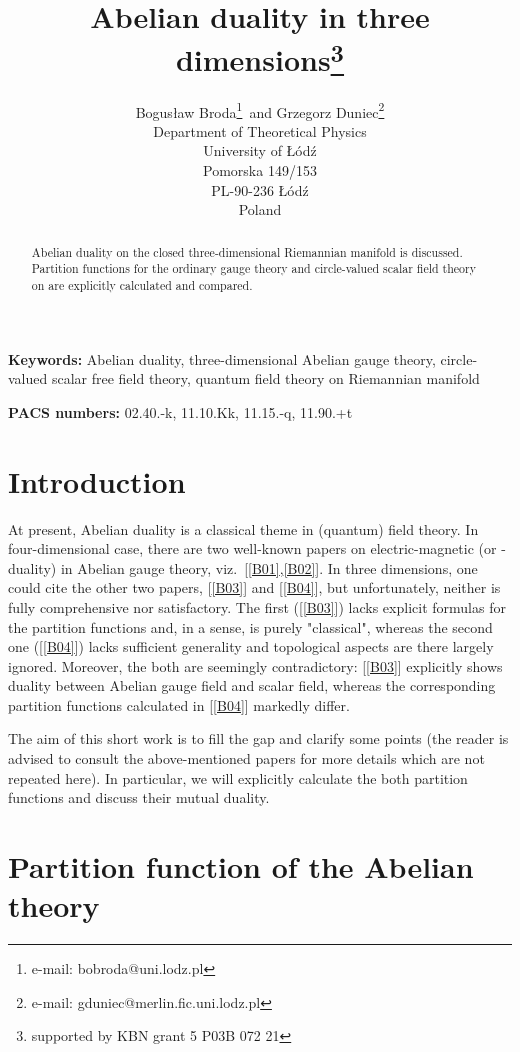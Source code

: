 \documentclass[a4paper,12pt]{article}
\title{Abelian duality in three dimensions\footnote{%
supported by KBN grant 5 P03B 072 21}}
\author{Bogus\l aw Broda\footnote{e-mail: bobroda@uni.lodz.pl}\, and    Grzegorz Duniec\footnote{e-mail: gduniec@merlin.fic.uni.lodz.pl}\\
Department of Theoretical Physics\\
                         University of \L \'od\'z\\
                           Pomorska 149/153\\
                          PL-90-236 \L \'od\'z\\
                                       Poland}
\begin{document}
\baselineskip24pt
\maketitle

\begin{abstract}
Abelian duality on the closed three-dimensional Riemannian manifold
\coordHE{} is discussed. Partition functions for the ordinary \coordHE{} gauge theory and circle-valued scalar field theory on \coordHE{} are
explicitly calculated and compared.
\end{abstract}

\noindent
{\bf Keywords:} Abelian duality, three-dimensional Abelian gauge theory, circle-valued scalar free field theory, quantum field theory on Riemannian manifold

\noindent
{\bf PACS numbers:} 02.40.-k, 11.10.Kk, 11.15.-q, 11.90.+t

\section{Introduction}

At present, Abelian duality is a classical theme in (quantum)
field theory. In four-dimensional case, there are two well-known
papers on electric-magnetic (or \coordHE{}-duality) in Abelian gauge
theory, viz.\ [\ref{B01},\ref{B02}]. In three dimensions, one could
cite the other two papers, [\ref{B03}] and [\ref{B04}], but
unfortunately, neither is fully comprehensive nor satisfactory.
The first ([\ref{B03}]) lacks explicit formulas for the partition
functions and, in a sense, is purely "classical", whereas the
second one ([\ref{B04}]) lacks sufficient generality and
topological aspects are there largely ignored. Moreover, the both
are seemingly contradictory: [\ref{B03}] explicitly shows duality
between Abelian gauge field and scalar field, whereas the
corresponding partition functions calculated in [\ref{B04}]
markedly differ.

The aim of this short work is to fill the gap and
clarify some points (the reader is advised to consult the above-mentioned papers for more
details which are not repeated here).
In particular, we will explicitly calculate the both partition functions and discuss their mutual duality.

\section{Partition function of the Abelian theory}
\end{document}
